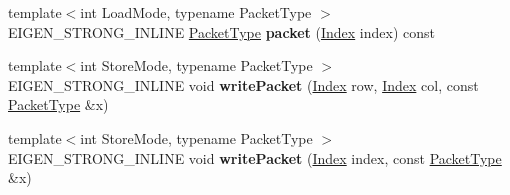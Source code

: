 \begin{DoxyCompactItemize}
\item 
\mbox{\label{struct_eigen_1_1internal_1_1mapbase__evaluator_a783c32aa529b4b3085190eef66fb2039}} 
{\footnotesize template$<$int Load\+Mode, typename Packet\+Type $>$ }\\E\+I\+G\+E\+N\+\_\+\+S\+T\+R\+O\+N\+G\+\_\+\+I\+N\+L\+I\+NE \hyperlink{struct_eigen_1_1_packet_type}{Packet\+Type} {\bfseries packet} (\hyperlink{namespace_eigen_a62e77e0933482dafde8fe197d9a2cfde}{Index} index) const
\item 
\mbox{\label{struct_eigen_1_1internal_1_1mapbase__evaluator_a4b7f13fced92d667256c097caccfba90}} 
{\footnotesize template$<$int Store\+Mode, typename Packet\+Type $>$ }\\E\+I\+G\+E\+N\+\_\+\+S\+T\+R\+O\+N\+G\+\_\+\+I\+N\+L\+I\+NE void {\bfseries write\+Packet} (\hyperlink{namespace_eigen_a62e77e0933482dafde8fe197d9a2cfde}{Index} row, \hyperlink{namespace_eigen_a62e77e0933482dafde8fe197d9a2cfde}{Index} col, const \hyperlink{struct_eigen_1_1_packet_type}{Packet\+Type} \&x)
\item 
\mbox{\label{struct_eigen_1_1internal_1_1mapbase__evaluator_ad86d8fc9ce0db49235ab5c80ba380ab1}} 
{\footnotesize template$<$int Store\+Mode, typename Packet\+Type $>$ }\\E\+I\+G\+E\+N\+\_\+\+S\+T\+R\+O\+N\+G\+\_\+\+I\+N\+L\+I\+NE void {\bfseries write\+Packet} (\hyperlink{namespace_eigen_a62e77e0933482dafde8fe197d9a2cfde}{Index} index, const \hyperlink{struct_eigen_1_1_packet_type}{Packet\+Type} \&x)
\end{DoxyCompactItemize}

